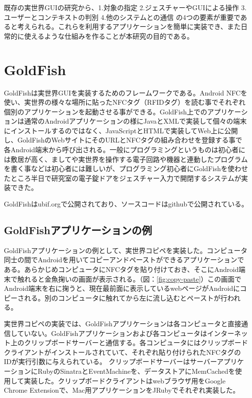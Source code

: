 既存の実世界GUIの研究から、1.対象の指定 2.ジェスチャーやGUIによる操作 3.ユーザーとコンテキストの判別 4.他のシステムとの通信 の4つの要素が重要であると考えられる。これらを利用するアプリケーションを簡単に実装でき、また日常的に使えるような仕組みを作ることが本研究の目的である。


\section{GoldFish}
GoldFishは実世界GUIを実装するためのフレームワークである。Android NFCを使い、実世界の様々な場所に貼ったNFCタグ（RFIDタグ）を読む事でそれぞれ個別のアプリケーションを起動させる事ができる。GoldFish上でのアプリケーションは通常のAndroidアプリケーションの様にJavaとXMLで実装して個々の端末にインストールするのではなく、JavaScriptとHTMLで実装してWeb上に公開し、GoldFishのWebサイトにそのURLとNFCタグの組み合わせを登録する事で各Android端末から呼び出される。一般にプログラミングというものは初心者には敷居が高く、ましてや実世界を操作する電子回路や機器と連動したプログラムを書く事などは初心者には難しいが、プログラミング初心者にGoldFishを使わせたところ半日で研究室の電子錠ドアをジェスチャー入力で開閉するシステムが実装できた。

GoldFishはubif.org\cite{goldfish}で公開されており、ソースコードはgithubで公開されている。\cite{github}


\subsection{GoldFishアプリケーションの例}
GoldFishアプリケーションの例として、実世界コピペを実装した。コンピュータ同士の間でAndroidを用いてコピーアンドペーストができるアプリケーションである。あらかじめコンピュータにNFCタグを貼り付けておき、そこにAndroid端末で触れると金魚掬いの画面が表示される。（図：\ref{fig:copy-paste}）この画面でAndroid端末を右に掬うと、現在最前面に表示しているwebページがAndroidにコピーされる。別のコンピュータに触れてから左に流し込むとペーストが行われる。

実世界コピペの実装では、GoldFishアプリケーションは各コンピュータと直接通信していない。GoldFishアプリケーションおよび各コンピュータはインターネット上のクリップボードサーバーと通信する。各コンピュータにはクリップボードクライアントがインストールされていて、それぞれ貼り付けられたNFCタグのIDが実行引数に与えられている。
クリップボードサーバーはサーバーアプリケーションにRubyのSinatraとEventMachineを、データストアにMemCachedを使用して実装した。クリップボードクライアントはwebブラウザ用をGoogle Chrome Extensionで、Mac用アプリケーションをJRubyでそれぞれ実装した。

